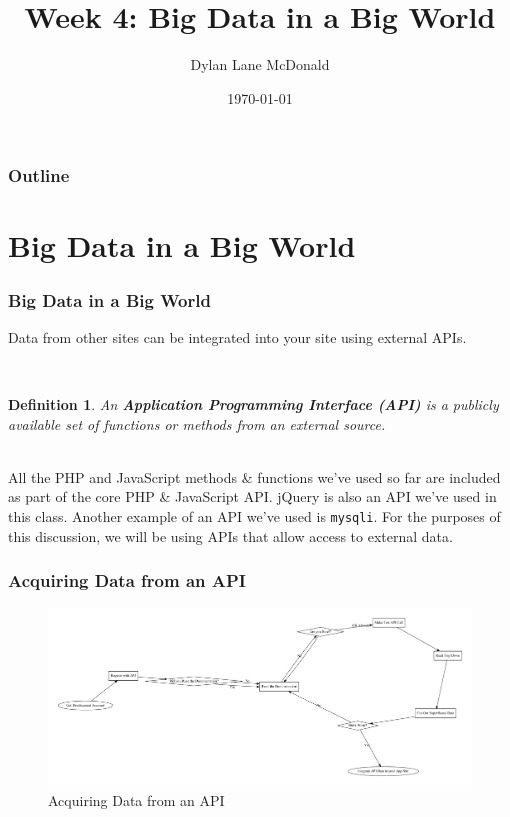 \documentclass[aspectratio=169]{beamer}
\title{Week 4: Big Data in a Big World}
\author{Dylan Lane McDonald}
\institute{CNM STEMulus Center\\Web Development with PHP}
\date{\today}
\newtheorem{defn}{Definition}
\begin{document}
\lstset{language=Java}
\begin{frame}
\titlepage
\end{frame}

\begin{frame}
\frametitle{Outline}
\tableofcontents
\end{frame}

\section{Big Data in a Big World}
\begin{frame}
\frametitle{Big Data in a Big World}
Data from other sites can be integrated into your site using external APIs.

\mbox{}\\
\begin{defn}
An \textbf{Application Programming Interface (API)} is a publicly available set of functions or methods from an external source.
\end{defn}

\mbox{}\\
All the PHP and JavaScript methods \& functions we've used so far are included as part of the core PHP \& JavaScript API. jQuery is also an API we've used in this class. Another example of an API we've used is \texttt{mysqli}. For the purposes of this discussion, we will be using APIs that allow access to external data.
\end{frame}

\begin{frame}
\frametitle{Acquiring Data from an API}
\begin{figure}
\includegraphics[scale=0.2]{../artifacts/json-roadmap.pdf}
\caption{Acquiring Data from an API}
\label{fig:jsonflow}
\end{figure}
\end{frame}
\end{document}
